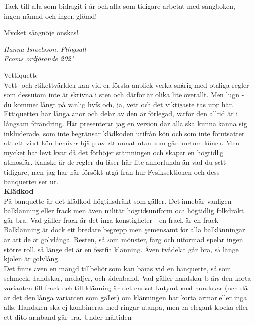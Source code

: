 \documentclass[a6paper,12pt]{article}
\begin{document}
Tack till alla som bidragit i år och alla som tidigare arbetat med sångboken, 
ingen nämnd och ingen glömd!

Mycket sångnöje önskas! 
\begin{flushright}
\textit{Hanna Israelsson, Flingsalt\\ Fcoms ordförande 2021}
\end{flushright}


\newpage



\newpage
\setlength{\oddsidemargin}{-0.57in}
\noindent
\Large Vettiquette\\
\footnotesize Vett- och etikettvärlden kan vid en första anblick verka 
snårig med otaliga regler som dessutom inte är skrivna i sten och 
därför är olika lite överallt. Men lugn - du kommer långt på vanlig 
hyfs och, ja, vett och det viktigaste tas upp här. Ettiquetten har 
långa anor och delar av den är förlegad, varför den alltid är i 
långsam förändring. Här presenterar jag en version där alla ska kunna 
känna sig inkluderade, som inte begränsar klädkoden utifrån kön och 
som inte förutsätter att ett visst kön behöver hjälp av ett annat 
utan som går bortom könen. Men mycket har levt kvar då det förhöjer 
stämningen och skapar en högtidlig atmosfär. Kanske är de regler du läser 
här lite annorlunda än vad du sett tidigare, men jag har här försökt 
utgå från hur Fysiksektionen och dess banquetter ser ut.\\
\normalsize\textbf{Klädkod}\\
\footnotesize På banquette är det klädkod högtidsdräkt som gäller. 
Det innebär vanligen balklänning eller frack men även militär högtidsuniform 
och högtidlig folkdräkt går bra. Vad gäller frack är det inga konstigheter 
- en frack är en frack. Balklänning är dock ett bredare begrepp men 
gemensamt för alla balklänningar är att de är golvlånga. Resten, så 
som mönster, färg och utformad spelar ingen större roll, så länge det 
är en festfin klänning. Även tvådelat går bra, så länge kjolen är golvlång.\\
Det finns även en mängd tillbehör som kan bäras vid en banquette, 
så som schmeck, handskar, medaljer, och sidenband. Vad gäller handskar b
ärs den korta 
\newpage
\setlength{\oddsidemargin}{-0.37in}
\noindent
varianten till frack och till klänning är det endast kutymt med handskar 
(och då är det den långa varianten som gäller) om klänningen har korta 
ärmar eller inga alls. Handsken ska ej kombineras med ringar utanpå, 
men en elegant klocka eller ett dito armband går bra. Under måltiden 
\end{document}

